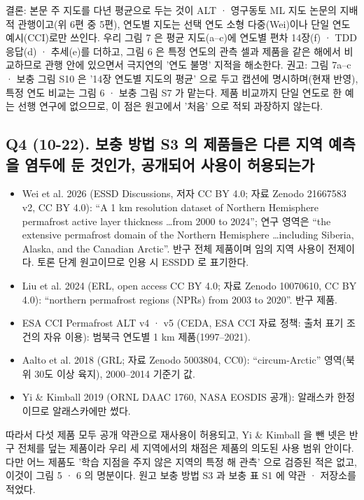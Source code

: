 \documentclass[10pt,a4paper]{article}
\begin{document}
결론: 본문 주 지도를 다년 평균으로 두는 것이 ALT · 영구동토 ML 지도 논문의 지배적 관행이고(위 6편 중 5편), 연도별 지도는 선택 연도 소형 다중(Wei)이나 단일 연도 예시(CCI)로만 쓰인다. 우리 그림 7 은 평균 지도(a--c)에 연도별 편차 14장(f) · TDD 응답(d) · 추세(e)를 더하고, 그림 6 은 특정 연도의 관측 셀과 제품을 같은 해에서 비교하므로 관행 안에 있으면서 극지연의 '연도 불명' 지적을 해소한다. 권고: 그림 7a--c · 보충 그림 S10 은 '14장 연도별 지도의 평균' 으로 두고 캡션에 명시하며(현재 반영), 특정 연도 비교는 그림 6 · 보충 그림 S7 가 맡는다. 제품 비교까지 단일 연도로 한 예는 선행 연구에 없으므로, 이 점은 원고에서 '처음' 으로 적되 과장하지 않는다.

\subsection*{Q4 (10-22). 보충 방법 S3 의 제품들은 다른 지역 예측을 염두에 둔 것인가, 공개되어 사용이 허용되는가}
\begin{itemize}\setlength{\itemsep}{1pt}
\item Wei et al. 2026 (ESSD Discussions, 저자 CC BY 4.0; 자료 Zenodo 21667583 v2, CC BY 4.0): ``A 1 km resolution dataset of Northern Hemisphere permafrost active layer thickness \ldots from 2000 to 2024''; 연구 영역은 ``the extensive permafrost domain of the Northern Hemisphere \ldots including Siberia, Alaska, and the Canadian Arctic''. 반구 전체 제품이며 임의 지역 사용이 전제이다. 토론 단계 원고이므로 인용 시 ESSDD 로 표기한다.
\item Liu et al. 2024 (ERL, open access CC BY 4.0; 자료 Zenodo 10070610, CC BY 4.0): ``northern permafrost regions (NPRs) from 2003 to 2020''. 반구 제품.
\item ESA CCI Permafrost ALT v4 · v5 (CEDA, ESA CCI 자료 정책: 출처 표기 조건의 자유 이용): 범북극 연도별 1 km 제품(1997--2021).
\item Aalto et al. 2018 (GRL; 자료 Zenodo 5003804, CC0): ``circum-Arctic'' 영역(북위 30도 이상 육지), 2000--2014 기준기 값.
\item Yi \& Kimball 2019 (ORNL DAAC 1760, NASA EOSDIS 공개): 알래스카 한정이므로 알래스카에만 썼다.
\end{itemize}
따라서 다섯 제품 모두 공개 약관으로 재사용이 허용되고, Yi \& Kimball 을 뺀 넷은 반구 전체를 덮는 제품이라 우리 세 지역에서의 채점은 제품의 의도된 사용 범위 안이다. 다만 어느 제품도 '학습 지점을 주지 않은 지역의 특정 해 관측' 으로 검증된 적은 없고, 이것이 그림 5 · 6 의 명분이다. 원고 보충 방법 S3 과 보충 표 S1 에 약관 · 저장소를 적었다.
\end{document}
